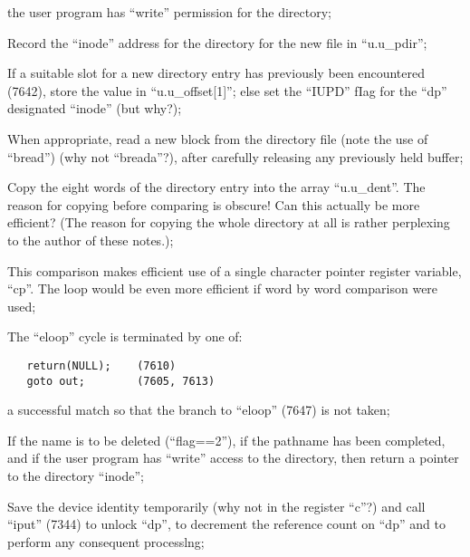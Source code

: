       \item[(c)] the user program has ``write''
      permission for the directory;
\ed

\item[7606:] Record the ``inode'' address for
      the directory for the new file in
      ``u.u\_pdir'';

\item[7607:] If a suitable slot for a new
      directory entry has previously
      been encountered (7642), store
      the value in ``u.u\_offset[1]'';
      else set the ``IUPD'' fIag for the
      ``dp'' designated ``inode'' (but why?);

\item[7622:] When appropriate, read a new
      block from the directory file
      (note the use of ``bread'') (why
      not ``breada''?), after carefully
      releasing any previously held
      buffer;

\item[7636:] Copy the eight words of the
      directory entry into the array
      ``u.u\_dent''. The reason for copying before comparing is obscure!
      Can this actually be more efficient? (The reason for copying
      the whole directory at all is
      rather perplexing to the author
      of these notes.);

\item[7645:] This comparison makes efficient
      use of a single character pointer
      register variable, ``cp''. The
      loop would be even more efficient
      if word by word comparison were
      used;

\item[7647:] The ``eloop'' cycle is terminated
      by one of:

\begin{verbatim}
   return(NULL);    (7610)
   goto out;        (7605, 7613)
\end{verbatim}

\noindent a successful match  so  that  the
branch  to  ``eloop'' (7647) is not
taken;

\item [7657:] If the  name  is  to  be  deleted
(``flag==2''),  if the pathname has
been completed, and if  the  user
program has ``write'' access to the
directory, then return a  pointer
to the directory ``inode'';

Save  the  device  identity  temporarily (why not in the register
``c''?) and call ``iput''  (7344)  to
unlock  ``dp'',  to  decrement  the
reference count on  ``dp''  and  to
perform  any  consequent processlng;

